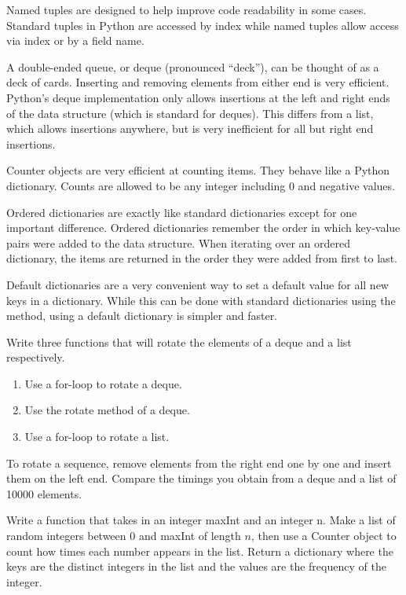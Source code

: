 Named tuples are designed to help improve code readability in some cases.
Standard tuples in Python are accessed by index while named tuples allow access via index or by a field name.

A double-ended queue, or deque (pronounced ``deck''), can be thought of as a deck of cards.
Inserting and removing elements from either end is very efficient.
Python's deque implementation only allows insertions at the left and right ends of the data structure (which is standard for deques).
This differs from a list, which allows insertions anywhere, but is very inefficient for all but right end insertions.
 
Counter objects are very efficient at counting items.  They behave like a Python dictionary.  Counts are allowed to be any integer including 0 and negative values.
 
Ordered dictionaries are exactly like standard dictionaries except for one important difference.
Ordered dictionaries remember the order in which key-value pairs were added to the data structure.
When iterating over an ordered dictionary, the items are returned in the order they were added from first to last.

Default dictionaries are a very convenient way to set a default value for all new keys in a dictionary.
While this can be done with standard dictionaries using the  method, using a default dictionary is simpler and faster.

\begin{problem}
Write three functions that will rotate the elements of a deque and a list respectively.
\begin{enumerate}
\item Use a for-loop to rotate a deque.
\item Use the rotate method of a deque.
\item Use a for-loop to rotate a list.
\end{enumerate}

To rotate a sequence, remove elements from the right end one by one and insert them on the left end.
Compare the timings you obtain from a deque and a list of 10000 elements.
\end{problem}

\begin{problem}
Write a function that takes in an integer maxInt and an integer n.
Make a list of random integers between 0 and maxInt of length $n$, then use a Counter object to count how times each number appears in the list.
Return a dictionary where the keys are the distinct integers in the list and the values are the frequency of the integer.
\end{problem}

